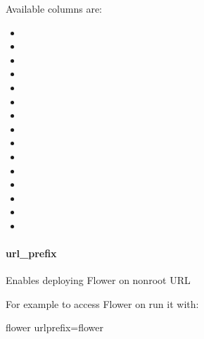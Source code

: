 \documentclass[letterpaper,10pt,english]{sphinxmanual}
\begin{document}
Available columns are:
\begin{itemize}
\item {} 

\item {} 

\item {} 

\item {} 

\item {} 

\item {} 

\item {} 

\item {} 

\item {} 

\item {} 

\item {} 

\item {} 

\item {} 

\item {} 

\item {} 

\end{itemize}


\paragraph{url\_prefix}
\label{\detokenize{config:url-prefix}}\label{\detokenize{config:id22}}
Enables deploying Flower on non\sphinxhyphen{}root URL

For example to access Flower on  run it with:

\begin{sphinxVerbatim}[commandchars=\\\{\}]
\PYGZdl{} flower \PYGZhy{}\PYGZhy{}url\PYGZus{}prefix=flower
\end{sphinxVerbatim}
\end{document}
